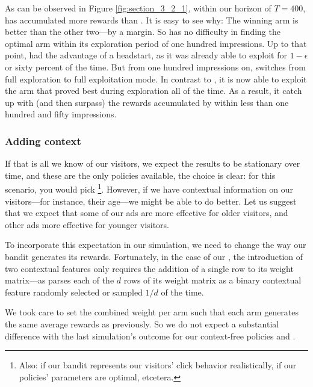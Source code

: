 \documentclass{jss}
\begin{document}
As can be observed in Figure \ref{fig:section_3_2_1}, within our horizon of $T = 400$,  has accumulated more rewards than . It is easy to see why: The winning arm is better than the other two---by a margin. So  has no difficulty in finding the optimal arm within its exploration period of one hundred impressions. Up to that point,  had the advantage of a headstart, as it was already able to exploit for $1- \epsilon$ or sixty percent of the time. But from one hundred impressions on,  switches from full exploration to full exploitation mode. In contrast to , it is now able to exploit the arm that proved best during exploration all of the time. As a result, it catch up with (and then surpass) the rewards accumulated by  within less than one hundred and fifty impressions.

\subsubsection{Adding context} \label{addingctx}

If that is all we know of our visitors, we expect the results to be stationary over time, and these are the only policies available, the choice is clear: for this scenario, you would pick \footnote{Also: if our bandit represents our visitors' click behavior realistically, if our policies' parameters are optimal, etcetera.}. However, if we have contextual information on our visitors---for instance, their age---we might be able to do better. Let us suggest that we expect that some of our ads are more effective for older visitors, and other ads more effective for younger visitors.

To incorporate this expectation in our simulation, we need to change the way our bandit generates its rewards. Fortunately, in the case of our , the introduction of two contextual features only requires the addition of a single row to its weight matrix---as  parses each of the $d$ rows of its weight matrix as a binary contextual feature randomly selected or sampled $1/d$ of the time.

We took care to set the combined weight per arm such that each arm generates the same average rewards as previously. So we do not expect a substantial difference with the last simulation's outcome for our context-free policies  and .
\end{document}
